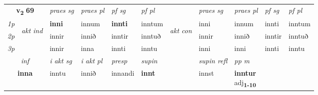 \noindent
\begin{tabular}{lllllllllll} \toprule
\multicolumn{2}{c}{\textbf{v{\textsubscript{2}}} \Large{\textbf{69}}}  &  \textit{praes sg}  & \textit{praes pl}  &\textit{ pf sg} & \textit{pf pl} &  &  \textit{praes sg}  & \textit{praes pl}  & \textit{pf sg} & \textit{pf pl } \\*
	\cmidrule{3-6} \cmidrule{8-11}
 {\textit{1p}} & \multirow{3}{*}{\begin{turn}{90}\textit{akt ind}\end{turn}} & \textbf{inni} & innum & \textbf{innti} & inntum & \multirow{3}{*}{\begin{turn}{90}\textit{akt con}\end{turn}} &inni & innum & innti & inntum\\*
 {\textit{2p}} &  &  innir  & innið & inntir & inntuð & & innir & innið & inntir & inntuð \\*
{\textit{3p}} &  & innir & inna & innti & inntu & & inni & inni& innti & inntu \\*
\cmidrule{3-6} \cmidrule{8-11}

   \multicolumn{2}{c}{\textit{inf}}  & \textit{i akt sg} & \textit{i akt pl}   & \textit{presp} & \textit{supin} && \textit{supin refl} & \textit{pp m} \\*
  \multicolumn{2}{c}{\textbf{inna}} & inntu  & innið   & innandi &  \textbf{innt} && innst & \specialcell{\textbf{inntur} \\ adj\textbf{\textsubscript{1-10}}} \\*
\end{tabular}

